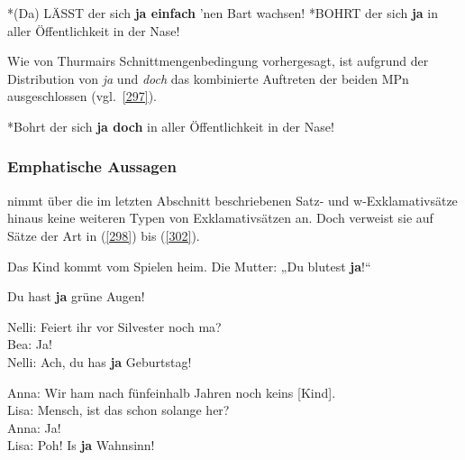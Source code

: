 \begin{exe}
	\ex\label{296} 
		\begin{xlist}	
			\ex\label{296a} *(Da) LÄSST der sich \textbf{ja einfach} 'nen Bart wachsen!
			\ex\label{296b} *BOHRT der sich \textbf{ja} in aller Öffentlichkeit in der Nase!
			\newline
			\hbox{}\hfill\hbox{\citet[218]{Rinas2006}}
		\end{xlist}
\end{exe}
Wie von Thurmairs Schnittmengenbedingung vorhergesagt, ist aufgrund der Distribution von \textit{ja} und \textit{doch} das kombinierte Auftreten der beiden MPn ausgeschlossen (vgl.\ \ref{297}).

\begin{exe}
	\ex\label{297} 
	*Bohrt der sich \textbf{ja doch} in aller Öffentlichkeit in der Nase!  
	\newline
	\hbox{}\hfill\hbox{\citet[235]{Rinas2006}}
\end{exe}

\subsubsection{Emphatische Aussagen}
\label{sec:empha}
\citet{Thurmair1989} nimmt über die im letzten Abschnitt beschriebenen Satz- und w-Exklamativsätze hinaus keine weiteren Typen von Exklamativsätzen an. Doch verweist sie auf Sätze der Art  in (\ref{298}) bis (\ref{302}).

\begin{exe}
	\ex\label{298} 
	Das Kind kommt vom Spielen heim. Die Mutter: „Du blutest \textbf{ja}!“
\end{exe}

\begin{exe}
	\ex\label{299} 
	Du hast \textbf{ja} grüne Augen!
\end{exe}	

\begin{exe}
	\ex\label{300} 
	Nelli: Feiert ihr vor Silvester noch ma?\\
	Bea: Ja!\\
	Nelli: Ach, du has \textbf{ja} Geburtstag!
\end{exe}	

\begin{exe}
	\ex\label{301} 
	Anna: Wir ham nach fünfeinhalb Jahren noch keins [Kind].\\
	Lisa: Mensch, ist das schon solange her?\\
	Anna: Ja!\\
	Lisa: Poh! Is \textbf{ja} Wahnsinn!
\end{exe}	
	

